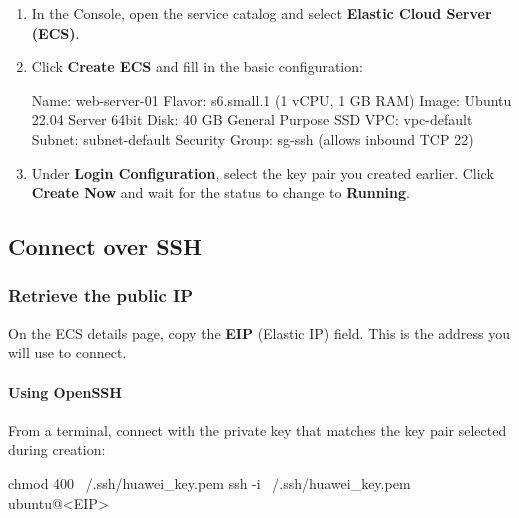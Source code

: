\documentclass[english]{labguide}
\begin{document}
\passoapasso
\begin{enumerate}
  \item In the Console, open the service catalog and select
        \textbf{Elastic Cloud Server (ECS)}.


  \item Click \textbf{Create ECS} and fill in the basic configuration:

  \begin{codigo}
Name:           web-server-01
Flavor:         s6.small.1 (1 vCPU, 1 GB RAM)
Image:          Ubuntu 22.04 Server 64bit
Disk:           40 GB General Purpose SSD
VPC:            vpc-default
Subnet:         subnet-default
Security Group: sg-ssh (allows inbound TCP 22)
  \end{codigo}

  \item Under \textbf{Login Configuration}, select the key pair you created
        earlier. Click \textbf{Create Now} and wait for the status to change
        to \textbf{Running}.


\end{enumerate}

\subsection{Connect over SSH}

\subsubsection{Retrieve the public IP}

On the ECS details page, copy the \textbf{EIP} (Elastic IP) field. This is
the address you will use to connect.

\paragraph{Using OpenSSH}
From a terminal, connect with the private key that matches the key pair
selected during creation:

\begin{codigo}[bash]
chmod 400 ~/.ssh/huawei_key.pem
ssh -i ~/.ssh/huawei_key.pem ubuntu@<EIP>
\end{codigo}
\end{document}
